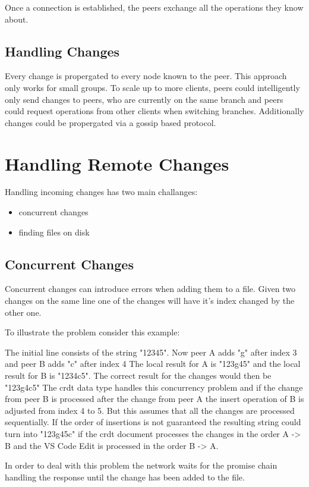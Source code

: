 Once a connection is established, the peers exchange all the operations they know about.

\subsection{Handling Changes}
Every change is propergated to every node known to the peer. This approach only works for small groups. To scale up to more clients, peers could intelligently only send changes to peers, who are currently on the same branch and peers could request operations from other clients when switching branches. Additionally changes could be propergated via a gossip based protocol.

\section{Handling Remote Changes}

Handling incoming changes has two main challanges:
\begin{itemize}
    \item concurrent changes
    \item finding files on disk
\end{itemize}

\subsection{Concurrent Changes}

Concurrent changes can introduce errors when adding them to a file. 
Given two changes on the same line one of the changes will have it's index changed by the other one.

To illustrate the problem consider this example:

The initial line consists of the string "12345".
Now peer A adds "g" after index 3 and peer B adds "c" after index 4
The local result for A is "123g45" and the local result for B is "1234c5".
The correct result for the changes would then be "123g4c5"
The crdt data type handles this concurrency problem and if the change from peer B is processed after the change from peer A the insert operation of B is adjusted from index 4 to 5.
But this assumes that all the changes are processed sequentially. If the order of insertions is not guaranteed the resulting string could turn into "123g45c" if the crdt document processes the changes in the order A -> B and the VS Code Edit is processed in the order B -> A.

In order to deal with this problem the network waits for the promise chain handling the response until the change has been added to the file.

